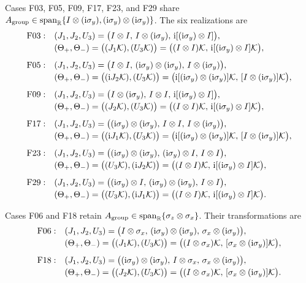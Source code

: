 Cases F03, F05, F09, F17, F23, and F29 share
\(A_{\rm group}\in\operatorname{span}_{\mathbb R}
\{I\otimes(\mathrm{i}\sigma_y),
(\mathrm{i}\sigma_y)\otimes(\mathrm{i}\sigma_y)\}\).
The six realizations are
\begin{align*}
\mathrm{F03}:\quad
 &(J_1,J_2,U_3)=
 \bigl(I\otimes I,\,I\otimes(\mathrm{i}\sigma_y),\,
 \mathrm{i}[(\mathrm{i}\sigma_y)\otimes I]\bigr),\\[-2pt]
 &(\Theta_+,\Theta_-)=
 \bigl((J_1\mathcal{K}),(U_3\mathcal{K})\bigr)
 =\bigl((I\otimes I)\mathcal{K},\,
 \mathrm{i}[(\mathrm{i}\sigma_y)\otimes I]\mathcal{K}\bigr),\\[4pt]
\mathrm{F05}:\quad
 &(J_1,J_2,U_3)=
 \bigl(I\otimes I,\,
 (\mathrm{i}\sigma_y)\otimes(\mathrm{i}\sigma_y),\,
 I\otimes(\mathrm{i}\sigma_y)\bigr),\\[-2pt]
 &(\Theta_+,\Theta_-)=
 \bigl((\mathrm{i} J_2\mathcal{K}),(U_3\mathcal{K})\bigr)
 =\bigl(\mathrm{i}[(\mathrm{i}\sigma_y)\otimes(\mathrm{i}\sigma_y)]\mathcal{K},\,
 [I\otimes(\mathrm{i}\sigma_y)]\mathcal{K}\bigr),\\[4pt]
\mathrm{F09}:\quad
 &(J_1,J_2,U_3)=
 \bigl(I\otimes(\mathrm{i}\sigma_y),\,I\otimes I,\,
 \mathrm{i}[(\mathrm{i}\sigma_y)\otimes I]\bigr),\\*[-2pt]
 &(\Theta_+,\Theta_-)=
 \bigl((J_2\mathcal{K}),(U_3\mathcal{K})\bigr)
 =\bigl((I\otimes I)\mathcal{K},\,
 \mathrm{i}[(\mathrm{i}\sigma_y)\otimes I]\mathcal{K}\bigr),\\[4pt]
\mathrm{F17}:\quad
 &(J_1,J_2,U_3)=
 \bigl((\mathrm{i}\sigma_y)\otimes(\mathrm{i}\sigma_y),\,
 I\otimes I,\,I\otimes(\mathrm{i}\sigma_y)\bigr),\\[-2pt]
 &(\Theta_+,\Theta_-)=
 \bigl((\mathrm{i} J_1\mathcal{K}),(U_3\mathcal{K})\bigr)
 =\bigl(\mathrm{i}[(\mathrm{i}\sigma_y)\otimes(\mathrm{i}\sigma_y)]\mathcal{K},\,
 [I\otimes(\mathrm{i}\sigma_y)]\mathcal{K}\bigr),\\[4pt]
\mathrm{F23}:\quad
 &(J_1,J_2,U_3)=
 \bigl((\mathrm{i}\sigma_y)\otimes(\mathrm{i}\sigma_y),\,
 (\mathrm{i}\sigma_y)\otimes I,\,I\otimes I\bigr),\\[-2pt]
 &(\Theta_+,\Theta_-)=
 \bigl((U_3\mathcal{K}),(\mathrm{i} J_2\mathcal{K})\bigr)
 =\bigl((I\otimes I)\mathcal{K},\,
 \mathrm{i}[(\mathrm{i}\sigma_y)\otimes I]\mathcal{K}\bigr),\\[4pt]
\mathrm{F29}:\quad
 &(J_1,J_2,U_3)=
 \bigl((\mathrm{i}\sigma_y)\otimes I,\,
 (\mathrm{i}\sigma_y)\otimes(\mathrm{i}\sigma_y),\,I\otimes I\bigr),\\[-2pt]
 &(\Theta_+,\Theta_-)=
 \bigl((U_3\mathcal{K}),(\mathrm{i} J_1\mathcal{K})\bigr)
 =\bigl((I\otimes I)\mathcal{K},\,
 \mathrm{i}[(\mathrm{i}\sigma_y)\otimes I]\mathcal{K}\bigr).
\end{align*}

Cases F06 and F18 retain
\(A_{\rm group}\in\operatorname{span}_{\mathbb R}
\{\sigma_z\otimes\sigma_x\}\).
Their transformations are
\begin{align*}
\mathrm{F06}:\quad
 &(J_1,J_2,U_3)=
 \bigl(I\otimes\sigma_x,\,
 (\mathrm{i}\sigma_y)\otimes(\mathrm{i}\sigma_y),\,
 \sigma_x\otimes(\mathrm{i}\sigma_y)\bigr),\\[-2pt]
 &(\Theta_+,\Theta_-)=
 \bigl((J_1\mathcal{K}),(U_3\mathcal{K})\bigr)
 =\bigl((I\otimes\sigma_x)\mathcal{K},\,
 [\sigma_x\otimes(\mathrm{i}\sigma_y)]\mathcal{K}\bigr),\\[4pt]
\mathrm{F18}:\quad
 &(J_1,J_2,U_3)=
 \bigl((\mathrm{i}\sigma_y)\otimes(\mathrm{i}\sigma_y),\,
 I\otimes\sigma_x,\,
 \sigma_x\otimes(\mathrm{i}\sigma_y)\bigr),\\[-2pt]
 &(\Theta_+,\Theta_-)=
 \bigl((J_2\mathcal{K}),(U_3\mathcal{K})\bigr)
 =\bigl((I\otimes\sigma_x)\mathcal{K},\,
 [\sigma_x\otimes(\mathrm{i}\sigma_y)]\mathcal{K}\bigr).
\end{align*}

